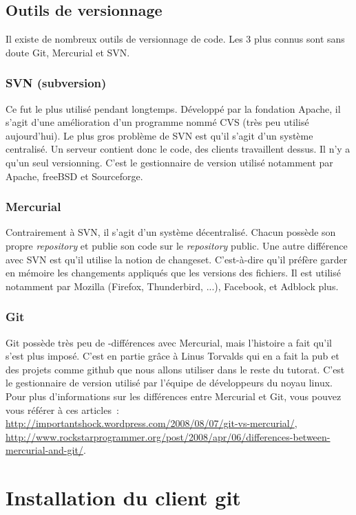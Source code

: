 \documentclass[a4paper,10pt]{report}
\begin{document}
    \subsection{Outils de versionnage}
Il existe de nombreux outils de versionnage de code. Les 3 plus connus sont sans doute Git, Mercurial et SVN.
      \subsubsection{SVN (subversion)}
Ce fut le plus utilis\'e pendant longtemps. D\'evelopp\'e par la fondation Apache, il s'agit d'une am\'elioration d'un programme nomm\'e CVS (tr\`es peu utilis\'e aujourd'hui). Le plus gros probl\`eme de SVN est qu'il s'agit d'un syst\`eme centralis\'e. Un serveur contient donc le code, des clients travaillent dessus. Il n'y a qu'un seul versionning. C'est le gestionnaire de version utilis\'e notamment par Apache, freeBSD et Sourceforge.
      \subsubsection{Mercurial}
Contrairement \`a SVN, il s'agit d'un syst\`eme d\'ecentralis\'e. Chacun poss\`ede son propre \emph{repository} et publie son code sur le \emph{repository} public. Une autre diff\'erence avec SVN est qu'il utilise la notion de changeset. C'est-\`a-dire qu'il pr\'ef\`ere garder en m\'emoire les changements appliqu\'es que les versions des fichiers. Il est utilis\'e notamment par Mozilla (Firefox, Thunderbird, ...), Facebook, et Adblock plus.
      \subsubsection{Git}
Git poss\`ede tr\`es peu de -diff\'erences avec Mercurial, mais l'histoire a fait qu'il s'est plus impos\'e.
C'est en partie grâce \`a Linus Torvalds qui en a fait la pub et des projets comme github que nous allons utiliser dans le reste du tutorat.
C'est le gestionnaire de version utilis\'e par l'\'equipe de d\'eveloppeurs du noyau linux.\\

Pour plus d'informations sur les diff\'erences entre Mercurial et Git, vous pouvez vous r\'ef\'erer \`a ces articles~: \url{http://importantshock.wordpress.com/2008/08/07/git-vs-mercurial/}, \url{http://www.rockstarprogrammer.org/post/2008/apr/06/differences-between-mercurial-and-git/}.
  \section{Installation du client git}
\end{document}

